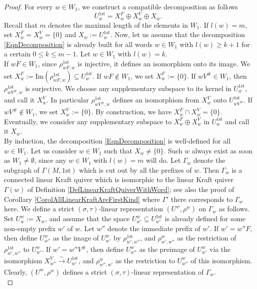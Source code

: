 \documentclass[12pt]{amsart}
\theoremstyle{definition}
\newcommand{\<}{\langle}   %
\renewcommand{\>}{\rangle} %
\begin{document}
\begin{proof}
    For every $w \in W_1$, we construct a compatible decomposition as follows
    \begin{equation}\label{EqnDecomposition}
        U_{w}^{1\mathrm{st}} = X_w^F \oplus X_w^V \oplus X_w.
    \end{equation}
    Recall that $m$ denotes the maximal length of the elements in $W_1$. If $l(w) = m$, set $X_w^F = X_w^V = \{0\}$ and $X_w := U_{w}^{1\mathrm{st}}$. Now, let us assume that the decomposition \eqref{EqnDecomposition} is already built for all words $w \in W_1$ with $l(w) \geq k+1$ for a certain $0 \leq k \leq m-1$. Let $w \in W_1$ with $l(w) = k$.\\
    If $wF \in W_1$, since $\rho_{wF,w}^{1\mathrm{st}}$ is injective, it defines an isomorphism onto its image. We set $X_{w}^F := \mathrm{Im}(\rho_{wF,w}^{1\mathrm{st}}) \subseteq  U_{w}^{1\mathrm{st}}$. If $wF \not \in W_1$, we set $X_w^F := \{0\}$. If $wV^{\#}\in W_1$, then $\rho_{wV^{\#},w}^{1\mathrm{st}}$ is surjective. We choose any supplementary subspace to its kernel in $U_{w}^{1\mathrm{st}}$, and call it $X_w^V$. In particular $\rho_{wV^{\#},w}^{1\mathrm{st}}$ defines an isomorphism from $X_w^V$ onto $U_{wV^{\#}}^{1\mathrm{st}}$. If $wV^{\#} \not \in W_1$, we set $X^V_w := \{0\}$. By construction, we have $X_w^F \cap X_w^V = \{0\}$. Eventually, we consider any supplementary subspace to $X_w^F \oplus X_w^V$ in $U_{w}^{1\mathrm{st}}$ and call it $X_w$.\\
    By induction, the decomposition \eqref{EqnDecomposition} is well-defined for all $w\in W_1$. Let us consider $w \in W_1$ such that $X_w \not = \{0\}$. Such $w$ always exist as soon as $W_1 \not = \emptyset$, since any $w \in W_1$ with $l(w) = m$ will do. Let $\Gamma_w$ denote the subgraph of $\Gamma(M,1\mathrm{st})$ which is cut out by all the prefixes of $w$. Then $\Gamma_w$ is a connected linear Kraft quiver which is isomorphic to the linear Kraft quiver $\Gamma(w)$ of Definition \ref{DefLinearKraftQuiverWithWord}; see also the proof of Corollary \ref{CorolAllLinearKraftAreFirstKind} where $\Gamma'$ there corresponds to $\Gamma_w$ here. We define a strict $(\sigma,\tau)$-linear representation $(U^w,\rho^w)$ on $\Gamma_w$ as follows. Set $U^w_w := X_w$, and assume that the space $U^w_{w'} \subseteq  U_{w'}^{1\mathrm{st}}$ is already defined for some non-empty prefix $w'$ of $w$. Let $w''$ denote the immediate prefix of $w'$. If $w' = w''F$, then define $U_{w''}^w$ as the image of $U^w_{w'}$ by $\rho_{w',w''}^{1\mathrm{st}}$, and $\rho^w_{w',w''}$ as the restriction of $\rho_{w',w''}^{1\mathrm{st}}$ to $U^w_{w'}$. If $w' = w''V^{\#}$, then define $U_{w''}^w$ as the preimage of $U^w_{w'}$ via the isomorphism $X_{w''}^V \xrightarrow{\sim} U_{w'}^{1\mathrm{st}}$, and $\rho^w_{w'',w'}$ as the restriction to $U^w_{w''}$ of this isomorphism. Clearly, $(U^w,\rho^w)$ defines a strict $(\sigma,\tau)$-linear representation of $\Gamma_w$.\\

\end{proof}
\end{document}
